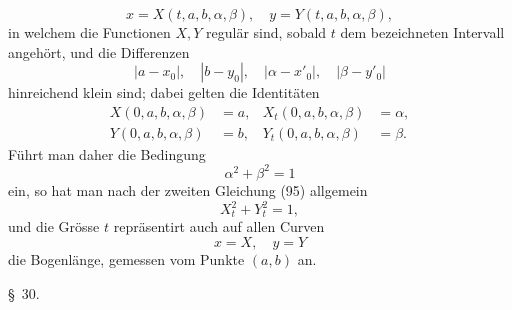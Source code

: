 \documentclass[11pt,a4paper,leqno]{article}
\begin{document}
\begin{equation}\tag{97}
x=X(t,a,b,\alpha,\beta),
\quad
y=Y(t,a,b,\alpha,\beta),
\end{equation}
in welchem die Functionen $X,Y$ regulär sind, sobald $t$ dem bezeichneten Intervall angehört, und die Differenzen
\[
|a-x_0|,
\quad
|b-y_0|,
\quad
|\alpha-x'_0|,
\quad
|\beta-y'_0|
\]
hinreichend klein sind; dabei gelten die Identitäten
\begin{equation}\tag{98}
\begin{aligned}
X(0,a,b,\alpha,\beta)&=a,
&X_t(0,a,b,\alpha,\beta)&=\alpha,\\
Y(0,a,b,\alpha,\beta)&=b,
&Y_t(0,a,b,\alpha,\beta)&=\beta.
\end{aligned}
\end{equation}
Führt man daher die Bedingung
\[
\alpha^2+\beta^2=1
\]
ein, so hat man nach der zweiten Gleichung (95) allgemein
\[
X_t^2+Y_t^2=1,
\]
und die Grösse $t$ repräsentirt auch auf allen Curven
\[
x=X,
\quad
y=Y
\]
die Bogenlänge, gemessen vom Punkte $(a,b)$ an.

\begin{center}{\large \S~30.}\end{center}
\end{document}
